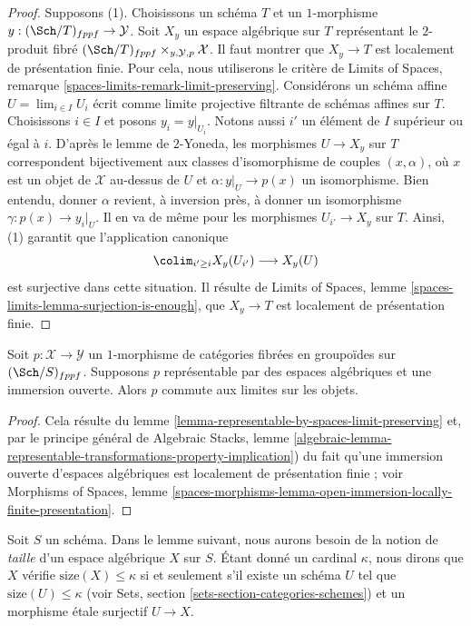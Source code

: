 \begin{proof}
\medskip\noindent
Supposons (1). Choisissons un schéma $T$ et un $1$-morphisme
$y : (\Sch/T)_{fppf} \to \mathcal{Y}$. Soit
$X_y$ un espace algébrique sur $T$ représentant le $2$-produit fibré
$(\Sch/T)_{fppf} \times_{y, \mathcal{Y}, p} \mathcal{X}$.
Il faut montrer que $X_y \to T$ est localement de présentation finie.
Pour cela, nous utiliserons le critère de
Limits of Spaces, remarque \ref{spaces-limits-remark-limit-preserving}.
Considérons un schéma affine $U = \lim_{i \in I} U_i$ écrit comme
limite projective filtrante de schémas affines sur $T$.
Choisissons $i \in I$ et posons $y_i = y|_{U_i}$. Notons aussi $i'$ un élément
de $I$ supérieur ou égal à $i$. D'après le lemme de $2$-Yoneda, les
morphismes $U \to X_y$ sur $T$ correspondent bijectivement
aux classes d'isomorphisme de couples $(x, \alpha)$, où $x$ est un objet
de $\mathcal{X}$ au-dessus de $U$ et $\alpha : y|_U \to p(x)$ un isomorphisme.
Bien entendu, donner $\alpha$ revient, à inversion près, à donner
un isomorphisme $\gamma : p(x) \to y_i|_U$.
Il en va de même pour les morphismes $U_{i'} \to X_y$ sur $T$. Ainsi, (1) garantit
que l'application canonique
$$
\colim_{i' \geq i} X_y(U_{i'}) \longrightarrow X_y(U)
$$
est surjective dans cette situation. Il résulte de
Limits of Spaces, lemme \ref{spaces-limits-lemma-surjection-is-enough},
que $X_y \to T$ est localement de présentation finie.
\end{proof}

\begin{lemma}
\label{lemma-open-immersion-limit-preserving}
Soit $p : \mathcal{X} \to \mathcal{Y}$ un $1$-morphisme de catégories
fibrées en groupoïdes sur $(\Sch/S)_{fppf}$. Supposons $p$ représentable
par des espaces algébriques et une immersion ouverte. Alors $p$ commute aux
limites sur les objets.
\end{lemma}

\begin{proof}
Cela résulte du
lemme \ref{lemma-representable-by-spaces-limit-preserving}
et, par le principe général de
Algebraic Stacks, lemme
\ref{algebraic-lemma-representable-transformations-property-implication})
du fait qu'une immersion ouverte d'espaces algébriques est
localement de présentation finie ; voir
Morphisms of Spaces, lemme
\ref{spaces-morphisms-lemma-open-immersion-locally-finite-presentation}.
\end{proof}

\noindent
Soit $S$ un schéma. Dans le lemme suivant, nous aurons besoin de la notion de
{\it taille} d'un espace algébrique $X$ sur $S$. Étant donné un cardinal
$\kappa$, nous dirons que $X$ vérifie $\text{size}(X) \leq \kappa$ si et seulement
s'il existe un schéma $U$ tel que $\text{size}(U) \leq \kappa$ (voir
Sets, section \ref{sets-section-categories-schemes}) et un morphisme
étale surjectif $U \to X$.

